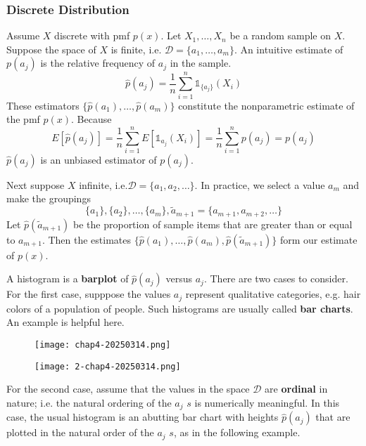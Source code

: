 \subsubsection{Discrete Distribution}

Assume $X$ discrete with pmf $p(x)$. Let $X_1,\dots,X_n$ be a random sample on $X$. Suppose the space of $X$ is finite, i.e. $\mathcal{D}=\{ a_1,\dots,a_m \}$. An intuitive estimate of $p(a_j)$ is the relative frequency of $a_j$ in the sample.
\[
\widehat{p}(a_j)=\frac{1}{n}\sum_{i=1}^{n} \mathbb{1}_{\{ a_j \}}(X_i)
\]
These estimators $\{ \widehat{p}(a_1),\dots,\widehat{p}(a_m) \}$ constitute the nonparametric estimate of the pmf $p(x)$. Because
\[
E[\widehat{p}(a_j)]=\frac{1}{n}\sum_{i=1}^{n} E[\mathbb{1}_{a_j}(X_i)]=\frac{1}{n}\sum_{i=1}^{n} p(a_j)=p(a_j)
\]
$\widehat{p}(a_j)$ is an unbiased estimator of $p(a_j)$.

Next suppose $X$ infinite, i.e.$\mathcal{D}=\{ a_1,a_2,\dots \}$. In practice, we select a value $a_m$ and make the groupings
\[
\{ a_1 \},\{ a_2 \},\dots,\{ a_m \},\widetilde{a}_{m+1}=\{ a_{m+1},a_{m+2},\dots \}
\]
Let $\widehat{p}(\widetilde{a}_{m+1})$ be the proportion of sample items that are greater than or equal to $a_{m+1}$. Then the estimates $\{ \widehat{p}(a_1),\dots,\widehat{p}(a_m),\widehat{p}(\widetilde{a}_{m+1}) \}$ form our estimate of $p(x)$.

A histogram is a \textbf{barplot} of $\widehat{p}(a_j)$ versus $a_j$. There are two cases to consider. For the first case, supppose the values $a_j$ represent qualitative categories, e.g. hair colors of a population of people. Such histograms are usually called \textbf{bar charts}. An example is helpful here.

\begin{figure}[H]
\centering
\texttt{[image: chap4-20250314.png]}
\label{}
\end{figure}

\begin{figure}[H]
\centering
\texttt{[image: 2-chap4-20250314.png]}
\label{}
\end{figure}

For the second case, assume that the values in the space $\mathcal{D}$ are \textbf{ordinal} in nature; i.e. the natural ordering of the $a_j$ $s$ is numerically meaningful. In this case, the usual histogram is an abutting bar chart with heights $\widehat{p}(a_j)$ that are plotted in the natural order of the $a_j$ $s$, as in the following example.

